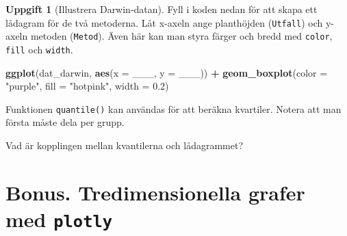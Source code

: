 \documentclass[
]{book}
\newenvironment{Shaded}{\begin{snugshade}}{\end{snugshade}}
\newcommand{\AttributeTok}[1]{\textcolor[rgb]{0.13,0.29,0.53}{#1}}
\newcommand{\FloatTok}[1]{\textcolor[rgb]{0.00,0.00,0.81}{#1}}
\newcommand{\FunctionTok}[1]{\textcolor[rgb]{0.13,0.29,0.53}{\textbf{#1}}}
\newcommand{\NormalTok}[1]{#1}
\newcommand{\OtherTok}[1]{\textcolor[rgb]{0.56,0.35,0.01}{#1}}
\newcommand{\SpecialCharTok}[1]{\textcolor[rgb]{0.81,0.36,0.00}{\textbf{#1}}}
\newcommand{\StringTok}[1]{\textcolor[rgb]{0.31,0.60,0.02}{#1}}
\theoremstyle{definition}
\theoremstyle{definition}
\theoremstyle{definition}
\newtheorem{exercise}{Uppgift}[chapter]
\theoremstyle{definition}
\theoremstyle{remark}
\begin{document}
\begin{exercise}[Illustrera Darwin-datan]
Fyll i koden nedan för att skapa ett lådagram för de två metoderna. Låt x-axeln ange planthöjden (\texttt{Utfall}) och y-axeln metoden (\texttt{Metod}). Även här kan man styra färger och bredd med \texttt{color}, \texttt{fill} och \texttt{width}.

\begin{Shaded}
\begin{Highlighting}[]
\FunctionTok{ggplot}\NormalTok{(dat\_darwin, }\FunctionTok{aes}\NormalTok{(}\AttributeTok{x =}\NormalTok{ \_\_\_, }\AttributeTok{y =}\NormalTok{ \_\_\_)) }\SpecialCharTok{+}
  \FunctionTok{geom\_boxplot}\NormalTok{(}\AttributeTok{color =} \StringTok{"purple"}\NormalTok{, }\AttributeTok{fill =} \StringTok{"hotpink"}\NormalTok{, }\AttributeTok{width =} \FloatTok{0.2}\NormalTok{)}
\end{Highlighting}
\end{Shaded}

Funktionen \texttt{quantile()} kan användas för att beräkna kvartiler. Notera att man första måste dela per grupp.

\begin{Shaded}
\end{Shaded}

Vad är kopplingen mellan kvantilerna och lådagrammet?
\end{exercise}

\hypertarget{bonus.-tredimensionella-grafer-med-plotly}{%
\section{\texorpdfstring{Bonus. Tredimensionella grafer med \texttt{plotly}}{Bonus. Tredimensionella grafer med plotly}}\label{bonus.-tredimensionella-grafer-med-plotly}}
\end{document}

